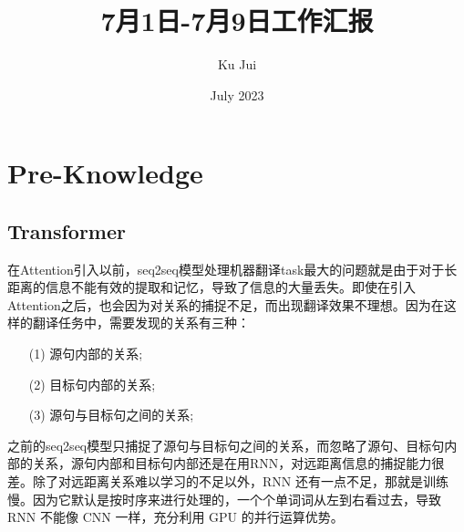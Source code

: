 \documentclass[letterpaper,10pt]{article}
\begin{document}
	
	
	\title{\songti {}7月1日-7月9日工作汇报}
	\author{\textrm{Ku Jui}}
	\date{\textrm{July 2023}}
	\maketitle
	
	\renewcommand{\figurename}{Figure} %
	\renewcommand{\contentsname}{Contents}
	\renewcommand{\tablename}{Table}
	\tableofcontents  %
	
	\section{Pre-Knowledge}
		
	\subsection{Transformer \cite{vaswani2017attention}}
	
	在Attention引入以前，seq2seq模型处理机器翻译task最大的问题就是由于对于长距离的信息不能有效的提取和记忆，导致了信息的大量丢失。即使在引入Attention之后，也会因为对关系的捕捉不足，而出现翻译效果不理想。因为在这样的翻译任务中，需要发现的关系有三种：
	
	\begin{itemize}
		\item [(1)]
			源句内部的关系;
		\item [(2)]
			目标句内部的关系;
		\item [(3)]
			源句与目标句之间的关系;
	\end{itemize}
	
	之前的seq2seq模型只捕捉了源句与目标句之间的关系，而忽略了源句、目标句内部的关系，源句内部和目标句内部还是在用RNN，对远距离信息的捕捉能力很差。除了对远距离关系难以学习的不足以外，RNN 还有一点不足，那就是训练慢。因为它默认是按时序来进行处理的，一个个单词词从左到右看过去，导致 RNN 不能像 CNN 一样，充分利用 GPU 的并行运算优势。
	
\end{document}
